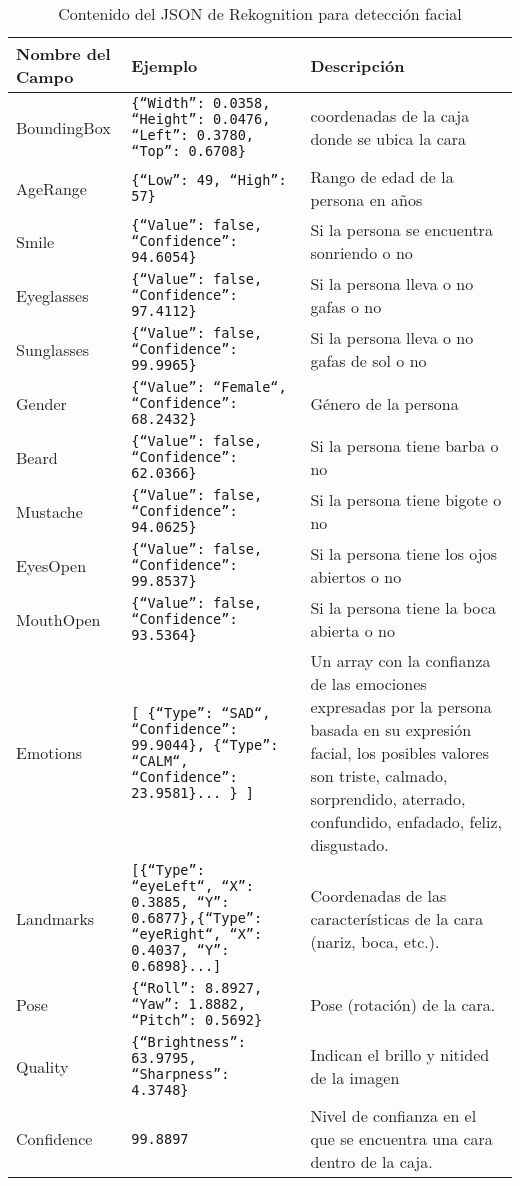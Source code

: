 \begin{table}[]
    \centering
    \begin{tabular}{|p{}|p{}|p{}|}
    \hline
    Nombre del Campo & Ejemplo & Descripción \\ \hline
    BoundingBox & \texttt{\{``Width'': 0.0358, ``Height'': 0.0476, ``Left'': 0.3780, ``Top'': 0.6708\}} & coordenadas de la caja donde se ubica la cara \\ \hline
    AgeRange & \texttt{\{``Low'': 49, ``High'': 57\}} & Rango de edad de la persona en años \\ \hline
    Smile & \texttt{\{``Value'': false, ``Confidence'': 94.6054\}} & Si la persona se encuentra sonriendo o no \\ \hline
    Eyeglasses & \texttt{\{``Value'': false, ``Confidence'': 97.4112\}} & Si la persona lleva o no gafas o no \\ \hline
    Sunglasses & \texttt{\{``Value'': false, ``Confidence'': 99.9965\}} & Si la persona lleva o no gafas de sol o no \\ \hline
    Gender & \texttt{\{``Value'': ``Female``, ``Confidence'': 68.2432\}} & Género de la persona \\ \hline
    Beard & \texttt{\{``Value'': false, ``Confidence'': 62.0366\}} & Si la persona tiene barba o no \\ \hline
    Mustache & \texttt{\{``Value'': false, ``Confidence'': 94.0625\}} & Si la persona tiene bigote o no \\ \hline
    EyesOpen & \texttt{\{``Value'': false, ``Confidence'': 99.8537\}} & Si la persona tiene los ojos abiertos o no \\ \hline
    MouthOpen & \texttt{\{``Value'': false, ``Confidence'': 93.5364\}} & Si la persona tiene la boca abierta o no \\ \hline
    Emotions & \texttt{{[} \{``Type'': ``SAD``, ``Confidence'': 99.9044\}, \{``Type'': ``CALM``, ``Confidence'': 23.9581\}... \} {]}} & Un array con la confianza de las emociones expresadas por la persona basada en su expresión facial, los posibles valores son triste, calmado, sorprendido, aterrado, confundido, enfadado, feliz, disgustado. \\ \hline
    Landmarks & \texttt{{[}\{``Type'': ``eyeLeft``, ``X'': 0.3885, ``Y'': 0.6877\},\{``Type'': ``eyeRight``, ``X'': 0.4037, ``Y'': 0.6898\}...{]}} & Coordenadas de las características de la cara (nariz, boca, etc.). \\ \hline
    Pose & \texttt{\{``Roll'': 8.8927, ``Yaw'': 1.8882, ``Pitch'': 0.5692\}} & Pose (rotación) de la cara. \\ \hline
    Quality & \texttt{\{``Brightness'': 63.9795, ``Sharpness'': 4.3748\}} & Indican el brillo y nitided de la imagen \\ \hline
    Confidence & \texttt{99.8897} & Nivel de confianza en el que se encuentra una cara dentro de la caja. \\ \hline
    \end{tabular}
    \caption{Contenido del JSON de Rekognition para detección facial}
    \label{tab:json_rekognition}
\end{table}

